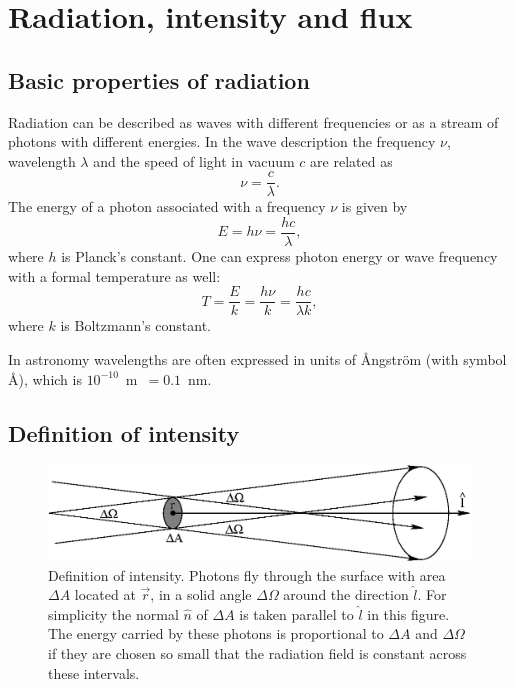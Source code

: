 \documentclass[12pt]{article}
\numberwithin{equation}{section}
\newcommand{\be}{\begin{equation}}
\newcommand{\ee}{\end{equation}}
\begin{document}
\clearpage
\section{Radiation, intensity and flux}

\subsection{Basic properties of radiation}

Radiation can be described as waves with different frequencies or as a stream of photons with different energies. In the wave description the frequency $\nu$, wavelength $\lambda$ and the speed of light in vacuum $c$ are related as
\be
\nu = \frac{c}{\lambda}.
\ee
The energy of a photon associated with a frequency $\nu$ is given by
\be
E = h \nu = \frac{hc}{\lambda},
\ee
where $h$ is Planck's constant. One can express photon energy or wave frequency with a formal temperature as well:
\be
T=\frac{E}{k} = \frac{h \nu}{k} = \frac{h c}{\lambda k},
\ee
where $k$ is Boltzmann's constant. 

In astronomy wavelengths are often expressed in units of \AA ngstr\"om (with symbol \AA), which is $10^{-10}$~m~$= 0.1$~nm.


\subsection{Definition of intensity}

\begin{figure}
  \centering
  \includegraphics[width=12cm]{figs/intensity_def}
  \caption{Definition of intensity. Photons fly through the surface with area $\Delta A$ located at $\vec{r}$, in  a solid angle $\Delta \Omega$ around the direction $\hat{l}$. For simplicity the normal $\hat{n}$ of $\Delta A$ is taken parallel to $\hat{l}$ in this figure. The energy carried by these photons is proportional to $\Delta A$ and $\Delta \Omega$ if they are chosen so small that the radiation field is constant across these intervals.
  \label{fig:intensity_def}}
\end{figure}
\end{document}
